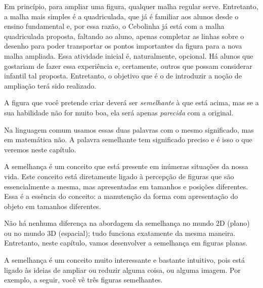 Em princípio, para ampliar uma figura, qualquer malha regular serve. Entretanto, a malha mais simples é a quadriculada, que já é familiar aos alunos desde o ensino fundamental e, por essa razão, o Cebolinha já está com a malha quadriculada proposta, faltando ao aluno, apenas completar as linhas sobre o desenho para poder transportar os pontos importantes da figura para a nova malha ampliada.
Essa atividade inicial é, naturalmente, opcional. Há alunos que gostariam de fazer essa experiência e, certamente, outros que possam considerar infantil tal proposta. Entretanto, o objetivo que é o de introduzir a noção de ampliação terá sido realizado.

A figura que você pretende criar deverá ser \textit{semelhante} à que está acima, mas se a sua habilidade não for muito boa, ela será apenas \textit{parecida} com a original.

Na linguagem comum usamos essas duas palavras com o mesmo significado, mas em matemática não. A palavra semelhante tem significado preciso e é isso o que veremos neste capítulo.

A semelhança é um conceito que está presente em inúmeras situações da nossa vida. Este conceito está diretamente ligado à percepção de figuras que são essencialmente a mesma, mas apresentadas em tamanhos e posições diferentes. Essa é a essência do conceito: a manutenção da forma com apresentação do objeto em tamanhos diferentes.

Não há nenhuma diferença na abordagem da semelhança no mundo 2D (plano) ou no mundo 3D (espacial); tudo funciona exatamente da mesma maneira. Entretanto, neste capítulo, vamos desenvolver a semelhança em figuras planas.

A semelhança é um conceito muito interessante e bastante intuitivo, pois está ligado às ideias de ampliar ou reduzir alguma coisa, ou alguma imagem. Por exemplo, a seguir, você vê três figuras semelhantes.

